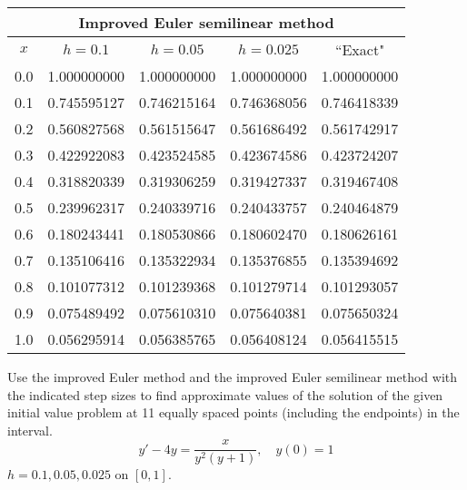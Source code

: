 \documentclass{ximera}
\begin{document}
\begin{problem}
\begin{solution}
{\small
\begin{tabular}{|c|r|r|r|r|}
\hline
\multicolumn{5}{|c|}{Improved Euler semilinear method}\\\hline
\multicolumn{1}{|c|}{$x$}&
\multicolumn{1}{|c|}{$h=0.1$}&
\multicolumn{1}{|c|}{$h=0.05$}&
\multicolumn{1}{|c|}{$h=0.025$}&
\multicolumn{1}{|c|}{``Exact"}\\ \hline
0.0 & 1.000000000 & 1.000000000 & 1.000000000 & 1.000000000 \\
0.1 & 0.745595127 & 0.746215164 & 0.746368056 & 0.746418339 \\
0.2 & 0.560827568 & 0.561515647 & 0.561686492 & 0.561742917 \\
0.3 & 0.422922083 & 0.423524585 & 0.423674586 & 0.423724207 \\
0.4 & 0.318820339 & 0.319306259 & 0.319427337 & 0.319467408 \\
0.5 & 0.239962317 & 0.240339716 & 0.240433757 & 0.240464879 \\
0.6 & 0.180243441 & 0.180530866 & 0.180602470 & 0.180626161 \\
0.7 & 0.135106416 & 0.135322934 & 0.135376855 & 0.135394692 \\
0.8 & 0.101077312 & 0.101239368 & 0.101279714 & 0.101293057 \\
0.9 & 0.075489492 & 0.075610310 & 0.075640381 & 0.075650324 \\
1.0 & 0.056295914 & 0.056385765 & 0.056408124 & 0.056415515 \\
\hline
\end{tabular}}
\end{solution}
\end{problem}

\begin{problem}\label{exer:3.2.21} Use the improved Euler method and the improved Euler semilinear method with the indicated step sizes to find approximate values of the solution of the given initial value problem at 11 equally spaced points (including the endpoints) in the interval.
$$y'-4y=\frac{x}{y^2(y+1)},\quad y(0)=1$$
 $h=0.1,0.05,0.025$ on $[0,1]$.
 \end{problem}
\end{document}
